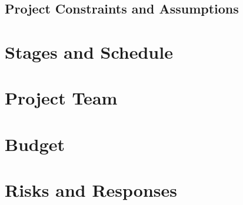 \documentclass{VUMIFPSkursinis}
\begin{document}
	\subsection{Project Constraints and Assumptions}

\section{Stages and Schedule}

\section{Project Team}

\section{Budget}

\section{Risks and Responses}
\end{document}
